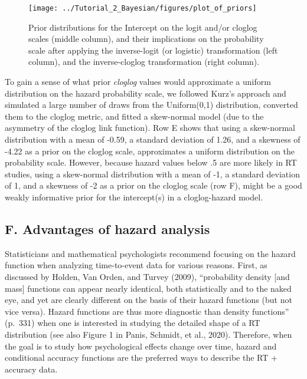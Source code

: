 \documentclass[
  man, donotrepeattitle,floatsintext]{apa6}
\begin{document}
\begin{figure}[H]

{\centering \texttt{[image: ../Tutorial\_2\_Bayesian/figures/plot\_of\_priors]} 

}

\caption{Prior distributions for the Intercept on the logit and/or cloglog scales (middle column), and their implications on the probability scale after applying the inverse-logit (or logistic) transformation (left column), and the inverse-cloglog transformation (right column).}\label{fig:plot-priors}
\end{figure}

To gain a sense of what prior \emph{cloglog} values would approximate a uniform distribution on the hazard probability scale, we followed Kurz's approach and simulated a large number of draws from the Uniform(0,1) distribution, converted them to the cloglog metric, and fitted a skew-normal model (due to the asymmetry of the cloglog link function). Row E shows that using a skew-normal distribution with a mean of -0.59, a standard deviation of 1.26, and a skewness of -4.22 as a prior on the cloglog scale, approximates a uniform distribution on the probability scale.
However, because hazard values below .5 are more likely in RT studies, using a skew-normal distribution with a mean of -1, a standard deviation of 1, and a skewness of -2 as a prior on the cloglog scale (row F), might be a good weakly informative prior for the intercept(s) in a cloglog-hazard model.

\subsection{F. Advantages of hazard analysis}\label{f.-advantages-of-hazard-analysis}

Statisticians and mathematical psychologists recommend focusing on the hazard function when analyzing time-to-event data for various reasons. First, as discussed by Holden, Van Orden, and Turvey (2009), ``probability density {[}and mass{]} functions can appear nearly identical, both statistically and to the naked eye, and yet are clearly different on the basis of their hazard functions (but not vice versa). Hazard functions are thus more diagnostic than density functions'' (p.~331) when one is interested in studying the detailed shape of a RT distribution (see also Figure 1 in Panis, Schmidt, et al., 2020). Therefore, when the goal is to study how psychological effects change over time, hazard and conditional accuracy functions are the preferred ways to describe the RT + accuracy data.
\end{document}

